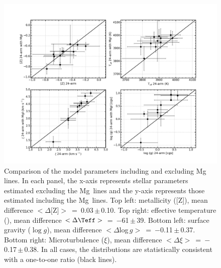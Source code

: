 \begin{figure}
 \centering
 \begin{center}
  \centering
  \includegraphics[width=\textwidth]{ngc6822/N6822-Mg-compare}
 \end{center}
 \caption[Best-fit parameter comparison including and excluding Mg\,\1]{
            Comparison of the model parameters including and excluding Mg\,\1 lines.
            In each panel, the x-axis represents stellar parameters estimated excluding the Mg\,\1 lines
            and the y-axis represents those estimated including the Mg\,\1 lines.
            Top left: metallicity ([Z]), mean difference
            $<\Delta[$Z$]>$~=~0.03\,$\pm$\,0.10.
            Top right: effective temperature (\Teff), mean difference
            $<\Delta\Teff>$~=~$-$61\,$\pm$\,39.
            Bottom left: surface gravity ($\log g$), mean difference
            $<\Delta$log\,$g>$~=~$-$0.11\,$\pm$\,0.37.
            Bottom right: Microturbulence ($\xi$), mean difference
            $<\Delta \xi>$~=~$-$0.17\,$\pm$\,0.38.
            In all cases, the distributions are statistically consistent with a one-to-one ratio (black lines).
          }
 \label{fig:24ATvs24Mg}
\end{figure}


